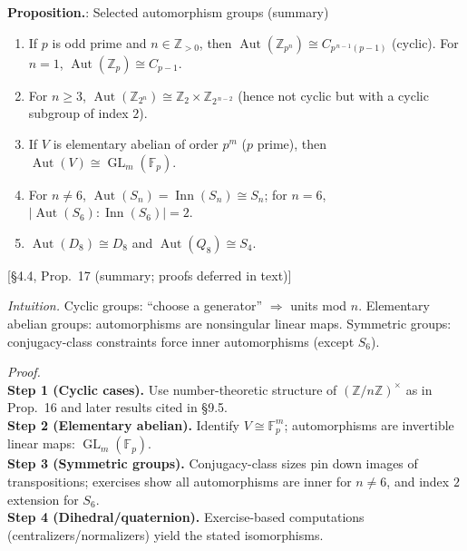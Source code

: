 \documentclass[12pt]{article}
\theoremstyle{definition}
\newcommand{\Aut}{\operatorname{Aut}}
\newcommand{\Inn}{\operatorname{Inn}}
\newcommand{\GL}{\operatorname{GL}}
\begin{document}

\newpage


\noindent\textbf{Proposition.}: Selected automorphism groups (summary)

\newpage

\begin{enumerate}\itemsep0.25em
  \item If $p$ is odd prime and $n\in\mathbb{Z}_{>0}$, then $\Aut(\mathbb{Z}_{p^n})\cong C_{p^{\,n-1}(p-1)}$ (cyclic). For $n=1$, $\Aut(\mathbb{Z}_p)\cong C_{p-1}$.\\
  \item For $n\ge3$, $\Aut(\mathbb{Z}_{2^n})\cong \mathbb{Z}_2\times \mathbb{Z}_{2^{\,n-2}}$ (hence not cyclic but with a cyclic subgroup of index $2$).\\
  \item If $V$ is elementary abelian of order $p^m$ ($p$ prime), then $\Aut(V)\cong \GL_m(\mathbb{F}_p)$.\\
  \item For $n\ne 6$, $\Aut(S_n)=\Inn(S_n)\cong S_n$; for $n=6$, $|\Aut(S_6):\Inn(S_6)|=2$.\\
  \item $\Aut(D_8)\cong D_8$ and $\Aut(Q_8)\cong S_4$. 
\end{enumerate}
\hfill {\footnotesize [§4.4, Prop.~17 (summary; proofs deferred in text)]}\\

\dotfill

\emph{Intuition.} Cyclic groups: “choose a generator” $\Rightarrow$ units mod $n$. Elementary abelian groups: automorphisms are nonsingular linear maps. Symmetric groups: conjugacy-class constraints force inner automorphisms (except $S_6$).

\dotfill

\emph{Proof.}\\
\textbf{Step 1 (Cyclic cases).} Use number-theoretic structure of $(\mathbb{Z}/n\mathbb{Z})^\times$ as in Prop.~16 and later results cited in §9.5.\\
\textbf{Step 2 (Elementary abelian).} Identify $V\cong \mathbb{F}_p^m$; automorphisms are invertible linear maps: $\GL_m(\mathbb{F}_p)$.\\
\textbf{Step 3 (Symmetric groups).} Conjugacy-class sizes pin down images of transpositions; exercises show all automorphisms are inner for $n\ne6$, and index $2$ extension for $S_6$.\\
\textbf{Step 4 (Dihedral/quaternion).} Exercise-based computations (centralizers/normalizers) yield the stated isomorphisms.\\
\end{document}
